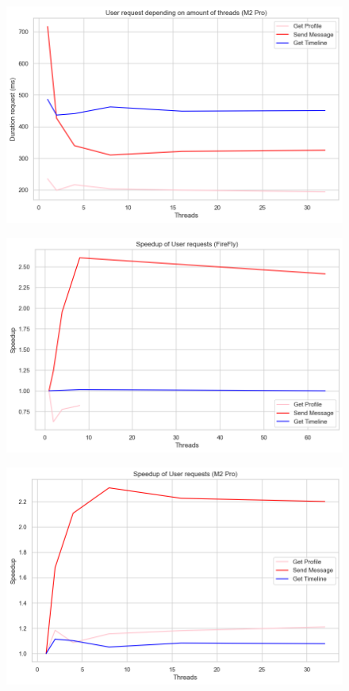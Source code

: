 \documentclass[a4paper]{article}
\begin{document}
\begin{figure}[H]
	\centering
	\includegraphics[width = \linewidth]{Images/SpeedupURMean.png}
	\caption{}
\end{figure}
\begin{figure}[H]
	\centering
	\includegraphics[width = \linewidth]{Images/SpeedupURMeanFireflyCom.png}
	\caption{}
\end{figure}
\begin{figure}[H]
	\centering
	\includegraphics[width = \linewidth]{Images/SpeedupURMeanCom.png}
	\caption{}
\end{figure}
\end{document}
